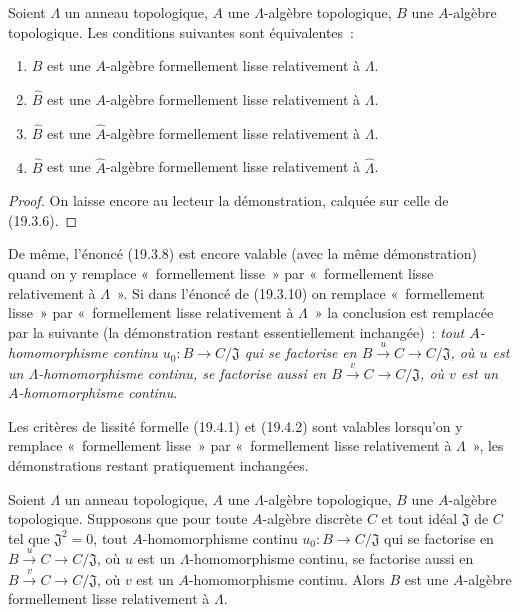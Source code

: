 \begin{proposition}[19.9.4]
\label{0.19.9.4-fr}
Soient $\Lambda$ un anneau topologique, $A$ une $\Lambda$-algèbre topologique,
$B$ une $A$-algèbre topologique. Les conditions suivantes sont équivalentes~:
\begin{enumerate}
  \item[a)] $B$ est une $A$-algèbre formellement lisse relativement à
  $\Lambda$.
  \item[b)] $\widehat B$ est une $A$-algèbre formellement lisse relativement à
  $\Lambda$.
  \item[c)] $\widehat B$ est une $\widehat A$-algèbre formellement lisse
  relativement à $\Lambda$.
  \item[d)] $\widehat B$ est une $\widehat A$-algèbre formellement lisse
  relativement à $\widehat\Lambda$.
\end{enumerate}
\end{proposition}

\begin{proof}
On laisse encore au lecteur la démonstration, calquée sur celle de (19.3.6).
\end{proof}


\begin{env}[19.9.5]
\label{0.19.9.5-fr}
De même, l'énoncé (19.3.8) est encore valable (avec la même démonstration) quand
on y remplace «~formellement lisse~» par «~formellement lisse relativement à
$\Lambda$~». Si dans l'énoncé de (19.3.10) on remplace «~formellement lisse~»
par «~formellement lisse relativement à $\Lambda$~» la conclusion est remplacée
par la suivante (la démonstration restant essentiellement inchangée)~: \emph{tout
$A$-homomorphisme continu $u_0:B\to C/\mathfrak J$ qui se factorise en
$B\xrightarrow{u}C\to C/\mathfrak J$, où $u$ est un $\Lambda$-homomorphisme
continu, se factorise aussi en $B\xrightarrow{v}C\to C/\mathfrak J$, où $v$
est un $A$-homomorphisme continu}.
\end{env}

\begin{env}[19.9.6]
\label{0.19.9.6-fr}
Les critères de lissité formelle (19.4.1) et (19.4.2) sont valables lorsqu'on y
remplace «~formellement lisse~» par «~formellement lisse relativement à
$\Lambda$~», les démonstrations restant pratiquement inchangées.
\end{env}

\begin{proposition}[19.9.7]
\label{0.19.9.7-fr}
Soient $\Lambda$ un anneau topologique, $A$ une $\Lambda$-algèbre topologique,
$B$ une $A$-algèbre topologique. Supposons que pour toute $A$-algèbre discrète
$C$ et tout idéal $\mathfrak J$ de $C$ tel que $\mathfrak J^2=0$, tout
$A$-homomorphisme continu $u_0:B\to C/\mathfrak J$ qui se factorise en
$B\xrightarrow{u}C\to C/\mathfrak J$, où $u$ est un $\Lambda$-homomorphisme
continu, se factorise aussi en $B\xrightarrow{v}C\to C/\mathfrak J$, où $v$
est un $A$-homomorphisme continu. Alors $B$ est une $A$-algèbre formellement
lisse relativement à $\Lambda$.
\end{proposition}

